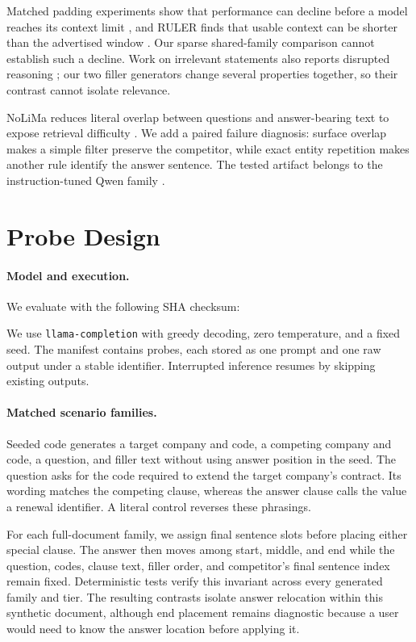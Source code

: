 \documentclass{article}
\begin{document}
Matched padding experiments show that performance can decline before a model reaches its context limit \citep{levy2024same}, and RULER finds that usable context can be shorter than the advertised window \citep{hsieh2024ruler}. Our sparse shared-family comparison cannot establish such a decline. Work on irrelevant statements also reports disrupted reasoning \citep{shi2023distracted}; our two filler generators change several properties together, so their contrast cannot isolate relevance.

NoLiMa reduces literal overlap between questions and answer-bearing text to expose retrieval difficulty \citep{modarressi2025nolima}. We add a paired failure diagnosis: surface overlap makes a simple filter preserve the competitor, while exact entity repetition makes another rule identify the answer sentence. The tested artifact belongs to the instruction-tuned Qwen family \citep{qwen2024qwen25}.

\section{Probe Design}

\paragraph{Model and execution.}
We evaluate \modelFile{} with the following SHA checksum:
\par\noindent\resizebox{\linewidth}{!}{\modelSha}\par
We use \texttt{llama-completion} with greedy decoding, zero temperature, and a fixed seed. The manifest contains \manifestProbeCount{} probes, each stored as one prompt and one raw output under a stable identifier. Interrupted inference resumes by skipping existing outputs.

\paragraph{Matched scenario families.}
Seeded code generates a target company and code, a competing company and code, a question, and filler text without using answer position in the seed. The question asks for the code required to extend the target company's contract. Its wording matches the competing clause, whereas the answer clause calls the value a renewal identifier. A literal control reverses these phrasings.

For each full-document family, we assign final sentence slots before placing either special clause. The answer then moves among start, middle, and end while the question, codes, clause text, filler order, and competitor's final sentence index remain fixed. Deterministic tests verify this invariant across every generated family and tier. The resulting contrasts isolate answer relocation within this synthetic document, although end placement remains diagnostic because a user would need to know the answer location before applying it.
\end{document}
